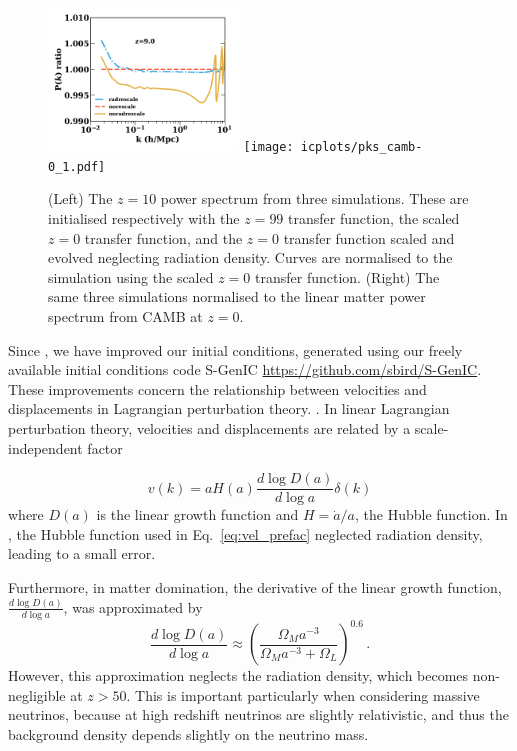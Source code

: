 \documentclass[useAMS, usenatbib]{mnras}
\begin{document}
\begin{figure}
\includegraphics[width=0.45\textwidth]{icplots/pks_rel-0_1.pdf}
\texttt{[image: icplots/pks\_camb-0\_1.pdf]}
  \caption{(Left) The $z=10$ power spectrum from three simulations.
  These are initialised respectively with the $z=99$ transfer function,
  the scaled $z=0$ transfer function, and the $z=0$ transfer function
  scaled and evolved neglecting radiation density.
  Curves are normalised to the simulation using the scaled $z=0$ transfer function.
  (Right) The same three simulations normalised to the linear matter
  power spectrum from CAMB at $z=0$.}
  \label{fig:rescaling}
\end{figure}


Since \cite{AHB}, we have improved our initial conditions, generated
using our freely available initial conditions code
S-GenIC \url{https://github.com/sbird/S-GenIC}. These improvements concern
the relationship between velocities and displacements in Lagrangian perturbation theory.
\citep{Zeldovich_1970, Scoccimarro_1998}. In linear Lagrangian perturbation theory,
velocities and displacements are related by a scale-independent factor

\begin{equation}
v(k) = a H(a) \frac{d \log D(a)}{d \log a} \delta(k)
\label{eq:vel_prefac}
\end{equation}
where $D(a)$ is the linear growth function and $H = \dot{a}/a$, the Hubble function.
In \cite{AHB}, the Hubble function used in Eq.~\ref{eq:vel_prefac}
neglected radiation density, leading to a small error.

Furthermore, in matter domination, the derivative of the linear growth function,
$\frac{d \log D(a)}{d \log a}$, was approximated by \citep{Bouchet:1995}
\begin{equation}
\frac{d \log D(a)}{d \log a} \approx \left(\frac{\Omega_M a^{-3}}{\Omega_M  a^{-3} + \Omega_L}\right)^{0.6}\,.
\end{equation}
However, this approximation neglects the radiation density, which becomes
non-negligible at $z > 50$. This is important particularly when considering
massive neutrinos, because at high redshift neutrinos are slightly relativistic,
and thus the background density depends slightly on the neutrino mass.
\end{document}
